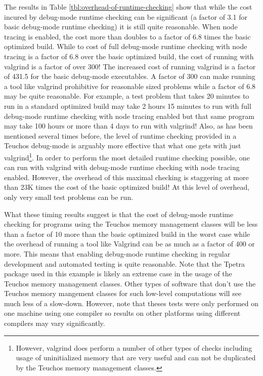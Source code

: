 \documentclass[pdf,ps2pdf,11pt]{SANDreport}
\begin{document}
The results in Table {}\ref{tbl:overhead-of-runtime-checking} show
that while the cost incured by debug-mode runtime checking can be
significant (a factor of 3.1 for basic debug-mode runtime checking) it
is still quite reasonable.  When node tracing is enabled, the cost
more than doubles to a factor of 6.8 times the basic optimized build.
While to cost of full debug-mode runtime checking with node tracing is
a factor of 6.8 over the basic optimized build, the cost of running
with valgrind is a factor of over 300!  The increased cost of running
valgrind is a factor of 431.5 for the basic debug-mode executables.  A
factor of 300 can make running a tool like valgrind prohibitive for
reasonable sized problems while a factor of 6.8 may be quite
reasonable.  For example, a test problem that takes 20 minutes to run
in a standard optimized build may take 2 hours 15 minutes to run with
full debug-mode runtime checking with node tracing enabled but that
same program may take 100 hours or more than 4 days to run with
valgrind!  Also, as has been mentioned several times before, the level
of runtime checking provided in a Teuchos debug-mode is arguably more
effective that what one gets with just valgrind\footnote{However,
valgrind does perform a number of other types of checks including
usage of uninitialized memory that are very useful and can not be
duplicated by the Teuchos memory management classes.}.  In order to
perform the most detailed runtime checking possible, one can run with
valgrind with debug-mode runtime checking with node tracing enabled.
However, the overhead of this maximal checking is staggering at more
than 23K times the cost of the basic optimized build!  At this level
of overhead, only very small test problems can be run.

What these timing results suggest is that the cost of debug-mode
runtime checking for programs using the Teuchos memory management
classes will be less than a factor of 10 more than the basic optimized
build in the worst case while the overhead of running a tool like
Valgrind can be as much as a factor of 400 or more.  This means that
enabling debug-mode runtime checking in regular development and
automated testing is quite reasonable.  Note that the Tpetra package
used in this example is likely an extreme case in the usage of the
Teuchos memory management classes.  Other types of software that don't
use the Teuchos memory mangement classes for such low-level
computations will see much less of a slow-down.  However, note that
theses tests were only performed on one machine using one compiler so
results on other platforms using different compilers may vary
significantly.
\end{document}

